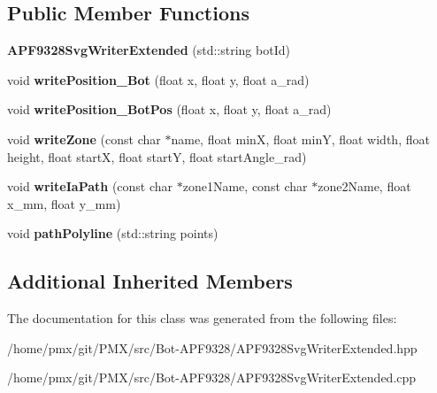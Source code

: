 \subsection*{Public Member Functions}
\begin{DoxyCompactItemize}
\item 
\mbox{\label{classAPF9328SvgWriterExtended_a0d5efaadc1d42447bb8fef89b29d4352}} 
{\bfseries A\+P\+F9328\+Svg\+Writer\+Extended} (std\+::string bot\+Id)
\item 
\mbox{\label{classAPF9328SvgWriterExtended_ab48011d363d76b64150a913aa9967d94}} 
void {\bfseries write\+Position\+\_\+\+Bot} (float x, float y, float a\+\_\+rad)
\item 
\mbox{\label{classAPF9328SvgWriterExtended_a37437abcd265d967a6375394667e6ae1}} 
void {\bfseries write\+Position\+\_\+\+Bot\+Pos} (float x, float y, float a\+\_\+rad)
\item 
\mbox{\label{classAPF9328SvgWriterExtended_a0d07b7f59b165488a16fce5b64ce12be}} 
void {\bfseries write\+Zone} (const char $\ast$name, float minX, float minY, float width, float height, float startX, float startY, float start\+Angle\+\_\+rad)
\item 
\mbox{\label{classAPF9328SvgWriterExtended_ab43cdf9deca7f2150be542f4d2aa5812}} 
void {\bfseries write\+Ia\+Path} (const char $\ast$zone1\+Name, const char $\ast$zone2\+Name, float x\+\_\+mm, float y\+\_\+mm)
\item 
\mbox{\label{classAPF9328SvgWriterExtended_a857ddbe523c42601873a9d5863c144fb}} 
void {\bfseries path\+Polyline} (std\+::string points)
\end{DoxyCompactItemize}
\subsection*{Additional Inherited Members}


The documentation for this class was generated from the following files\+:\begin{DoxyCompactItemize}
\item 
/home/pmx/git/\+P\+M\+X/src/\+Bot-\/\+A\+P\+F9328/A\+P\+F9328\+Svg\+Writer\+Extended.\+hpp\item 
/home/pmx/git/\+P\+M\+X/src/\+Bot-\/\+A\+P\+F9328/A\+P\+F9328\+Svg\+Writer\+Extended.\+cpp\end{DoxyCompactItemize}
